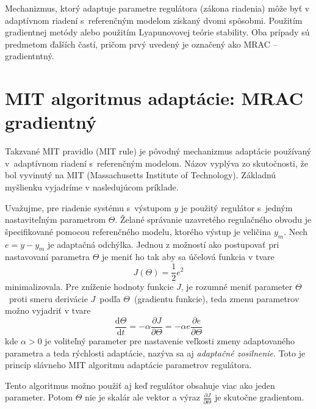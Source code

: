 \documentclass[a4paper, 10pt, ]{article}
\begin{document}
Mechanizmus, ktorý adaptuje parametre regulátora (zákona riadenia) môže byť v adaptívnom riadení s~referenčným modelom získaný dvomi spôsobmi. Použitím gradientnej metódy alebo použitím Lyapunovovej teórie stability. Oba prípady sú predmetom ďalších častí, pričom prvý uvedený je označený ako MRAC -- gradientntný.









\section{MIT algoritmus adaptácie: MRAC gradientný}



Takzvané MIT pravidlo (MIT rule) je pôvodný mechanizmus adaptácie používaný v~adaptívnom riadení s~referenčným modelom. Názov vyplýva zo skutočnosti, že bol vyvinutý na MIT (Massachusetts Institute of Technology). Základnú myšlienku vyjadríme v nasledujúcom príklade.

Uvažujme, pre riadenie systému s~výstupom $y$ je použitý regulátor s~jedným nastaviteľným parametrom $\Theta$. Želané správanie uzavretého regulačného obvodu je špecifikované pomocou referenčného modelu, ktorého výstup je veličina $y_m$. Nech $e = y - y_m$ je adaptačná odchýlka. Jednou z možností ako postupovať pri nastavovaní parametra $\Theta$ je meniť ho tak aby sa účelová funkcia v tvare
\begin{equation}
	J(\Theta) = \frac{1}{2} e^2
\end{equation}
minimalizovala. Pre zníženie hodnoty funkcie $J$, je rozumné meniť parameter $\Theta$~proti smeru derivácie $J$~podľa $\Theta$~(gradientu funkcie), teda zmenu parametrov možno vyjadriť v tvare
\begin{equation}
	\frac{\text{d}\Theta}{\text{d}t} = - \alpha \frac{\partial J}{\partial \Theta} = - \alpha e \frac{\partial e}{\partial \Theta}
\end{equation}
kde $\alpha > 0$ je voliteľný parameter pre nastavenie veľkosti zmeny adaptovaného parametra a teda rýchlosti adaptácie, nazýva sa aj \emph{adaptačné zosilnenie}. Toto je princíp slávneho MIT algoritmu adaptácie parametrov regulátora.

Tento algoritmus možno použiť aj keď regulátor obsahuje viac ako jeden parameter. Potom $\Theta$ nie je skalár ale vektor a výraz $\frac{\partial J}{\partial \Theta}$ je skutočne gradientom.
\end{document}
